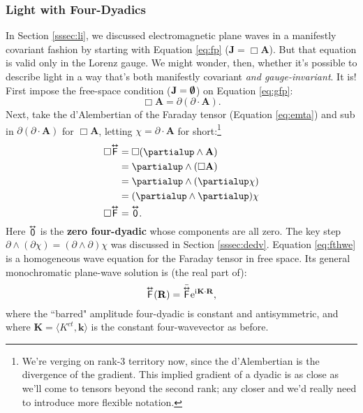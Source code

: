 \documentclass[12pt]{article}
\renewcommand{\vv}[1]{\mathbf{#1}}
\newcommand{\tightoverset}[2]{%
  \mathop{#2}\limits^{\vbox to -.5ex{\kern-0.75ex\hbox{$#1$}\vss}}}
\newcommand{\inlinedy}[1]{\tightoverset{\text{\tiny$\bm\leftrightarrow$}}{#1}}
\newcommand{\capdy}[1]{ \overset{ \text{\tiny$\bm\leftrightarrow$} }{\vphantom{\text{\small{A}}}\smash{#1}} }
\begin{document}
\subsubsection{Light with Four-Dyadics}

In Section \ref{sssec:li}, we discussed electromagnetic plane waves in a manifestly covariant fashion by starting with Equation \ref{eq:fp} ($\vv J = \Box \vv A$). But that equation is valid only in the Lorenz gauge. We might wonder, then, whether it's possible to describe light in a way that's both manifestly covariant \emph{and gauge-invariant}. It is! First impose the free-space condition ($\vv J = \textrm{\mbox{\boldmath $\emptyset$}}$) on Equation \ref{eq:gfp}:
\begin{equation*}
\Box \vv A = \partialup(\partialup \cdot \vv A).
\end{equation*}
Next, take the d'Alembertian of the Faraday tensor (Equation \ref{eq:emta}) and sub in $\partialup(\partialup \cdot \vv A)$ for $\Box \vv A$, letting $\chi = \partialup \cdot \vv A$ for short:\footnote{We're verging on rank-3 territory now, since the d'Alembertian is the divergence of the gradient. This implied gradient of a dyadic is as close as we'll come to tensors beyond the second rank; any closer and we'd really need to introduce more flexible notation.}
\begin{equation}\label{eq:fthwe}
\begin{split}
\Box \capdy{\mathsf{F}} &= \Box ( \partialup \wedge \vv A ) \\
&= \partialup \wedge ( \Box \vv A) \\
&= \partialup \wedge (\partialup \chi) \\
&= ( \partialup \wedge \partialup ) \chi \\
\Box \capdy{\mathsf{F}} &= \capdy{\mathsf{0}} .
\end{split}
\end{equation}
Here $\inlinedy{\mathsf{0}}$ is the \textbf{zero four-dyadic} whose components are all zero. The key step $\partialup \wedge (\partialup \chi) = (\partialup \wedge \partialup) \chi$ was discussed in Section \ref{sssec:dedv}. Equation \ref{eq:fthwe} is a homogeneous wave equation for the Faraday tensor in free space. Its general monochromatic plane-wave solution is (the real part of):
\begin{equation}\label{eq:ftwe}
\capdy{\mathsf{F}} (\vv R) = \bar{\capdy{\mathsf{F}}} \mathrm{e}^{\mathrm{i} \mkern.5mu \vv K \cdot \vv R} ,
\end{equation}
where the ``barred" amplitude four-dyadic is constant and antisymmetric, and where $\vv K = \langle K^{ct}, \vv k \rangle$ is the constant four-wavevector as before.
\end{document}
